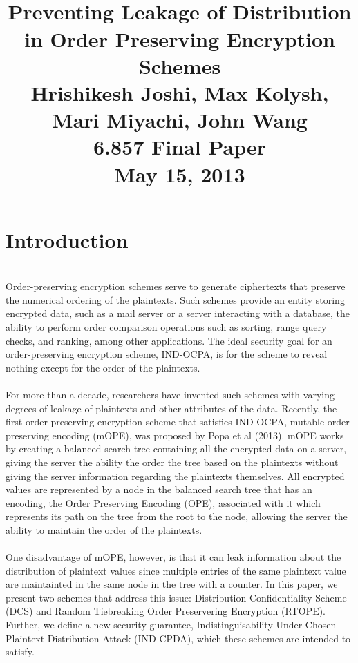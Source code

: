 \documentclass[12pt]{article}
\title{ \\
  Preventing Leakage of Distribution in Order Preserving Encryption Schemes \\ \vspace*{.3in}
\small Hrishikesh Joshi, Max Kolysh, Mari Miyachi, John Wang \\
\small 6.857 Final Paper \\
\small May 15, 2013}
\date{}
\begin{document}
\maketitle

\section{Introduction} \\
Order-preserving encryption schemes serve to generate ciphertexts that preserve the numerical ordering of the plaintexts. Such schemes provide an entity storing encrypted data, such as a mail server or a server interacting with a database, the ability to perform order comparison operations such as sorting, range query checks, and ranking, among other applications. The ideal security goal for an order-preserving encryption scheme, IND-OCPA, is for the scheme to reveal nothing except for the order of the plaintexts. \\ \\
For more than a decade, researchers have invented such schemes with varying degrees of leakage of plaintexts and other attributes of the data. Recently, the first order-preserving encryption scheme that satisfies IND-OCPA, mutable order-preserving encoding (mOPE), was proposed by Popa et al (2013). mOPE works by creating a balanced search tree containing all the encrypted data on a server, giving the server the ability the order the tree based on the plaintexts without giving the server information regarding the plaintexts themselves. All encrypted values are represented by a node in the balanced search tree that has an encoding, the Order Preserving Encoding (OPE), associated with it which represents its path on the tree from the root to the node, allowing the server the ability to maintain the order of the plaintexts. \\ \\ 
One disadvantage of mOPE, however, is that it can leak information about the distribution of plaintext values since multiple entries of the same plaintext value are maintainted in the same node in the tree with a counter. In this paper, we present two schemes that address this issue: Distribution Confidentiality Scheme (DCS) and Random Tiebreaking Order Preservering Encryption (RTOPE). Further, we define a new security guarantee, Indistinguisability Under Chosen Plaintext Distribution Attack (IND-CPDA), which these schemes are intended to satisfy. \\ \\
\end{document}
